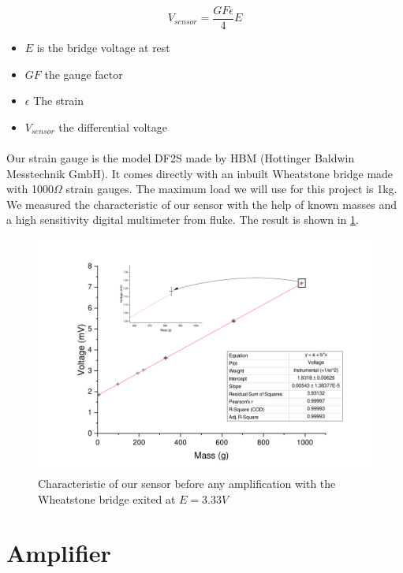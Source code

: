 \documentclass{article}[12pt]
\begin{document}
\begin{equation}
V_{sensor}=\dfrac{GF \epsilon}{4}E
\end{equation}
\begin{itemize}
\item $E$ is the bridge voltage at rest
\item $GF$ the gauge factor
\item $\epsilon$ The strain
\item $V_{sensor}$ the differential voltage
\end{itemize}
\paragraph{}
Our strain gauge is the model DF2S made by HBM (Hottinger Baldwin Messtechnik GmbH). It comes directly with an inbuilt Wheatstone bridge made with 1000$\Omega$ strain gauges. The maximum load we will use for this project is 1kg. We measured the characteristic of our sensor with the help of known masses and a high sensitivity digital multimeter from fluke. The result is shown in \ref{fig:beforeamp}.
\begin{figure}[H]
	\centering
	\includegraphics[width=\textwidth]{figures/beforeamp.pdf}
	\caption{Characteristic of our sensor before any amplification with the Wheatstone bridge exited at $E=3.33V$}
	\label{fig:beforeamp}
\end{figure}

\section{Amplifier}
\end{document}
